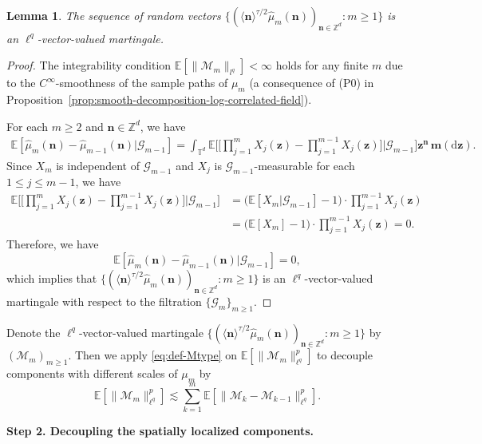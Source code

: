 \documentclass[12pt]{amsart}
\newtheorem{lemma}[theorem]{Lemma}
\theoremstyle{definition}
\theoremstyle{remark}
\newcommand{\bz}{\boldsymbol{z}}
\newcommand{\Z}{\mathbb{Z}}
\newcommand{\E}{\mathbb{E}}
\newcommand{\T}{\mathbb{T}}
\numberwithin{equation}{section}
\begin{document}
\begin{lemma}
The sequence of random vectors $\{(\langle \boldsymbol{n}\rangle^{\tau/2}\widehat{\mu}_m(\boldsymbol{n}))_{\boldsymbol{n}\in \Z^d}:m\ge 1\}$ is an $\ell^q$-vector-valued martingale.
\end{lemma}
\begin{proof}

The integrability condition $\E[\|\mathcal{M}_m\|_{l^q}] < \infty$ holds for any finite $m$ due to the $C^\infty$-smoothness of the sample paths of $\mu_m$ (a consequence of (P0) in Proposition~\ref{prop:smooth-decomposition-log-correlated-field}).

For each $m\ge 2$ and $\boldsymbol{n}\in \Z^d$, we have
\begin{align*}
\E[\widehat{\mu}_m(\boldsymbol{n})-\widehat{\mu}_{m-1}(\boldsymbol{n})|\mathscr{G}_{m-1}]=\int_{\T^d}\E\Big[\big[\prod_{j=1}^m X_j(\bz)-\prod_{j=1}^{m-1}X_j(\bz)\big]\Big| \mathscr{G}_{m-1}\Big]\bz^{\boldsymbol{n}}\,\boldsymbol{m}(\mathrm{d}\bz).
\end{align*}
Since $X_m$ is independent of $\mathscr{G}_{m-1}$ and $X_j$ is $\mathscr{G}_{m-1}$-measurable for each $1\le j\le m-1$, we have
\begin{align*}
\E\Big[\big[\prod_{j=1}^m X_j(\bz)-\prod_{j=1}^{m-1}X_j(\bz)\big]\Big| \mathscr{G}_{m-1}\Big]&=\big(\E[X_m|\mathscr{G}_{m-1}]-1\big)\cdot \prod_{j=1}^{m-1}X_j(\bz)\\
&=\big(\E[X_m]-1\big)\cdot \prod_{j=1}^{m-1}X_j(\bz)=0.
\end{align*}
Therefore, we have
\[
\E[\widehat{\mu}_m(\boldsymbol{n})-\widehat{\mu}_{m-1}(\boldsymbol{n})|\mathscr{G}_{m-1}]=0,
\]
which implies that $\{(\langle \boldsymbol{n}\rangle^{\tau/2}\widehat{\mu}_m(\boldsymbol{n}))_{\boldsymbol{n}\in \Z^d}:m\ge 1\}$ is an $\ell^q$-vector-valued martingale with respect to the filtration $\{\mathscr{G}_m\}_{m\ge 1}$.
\end{proof}
Denote the $\ell^q$-vector-valued martingale $\{(\langle \boldsymbol{n}\rangle^{\tau/2}\widehat{\mu}_m(\boldsymbol{n}))_{\boldsymbol{n}\in \Z^d}:m\ge 1\}$ by $(\mathcal{M}_m)_{m\ge 1}$. Then we apply \eqref{eq:def-Mtype} on $\E[\|\mathcal{M}_m\|_{\ell^q}^p]$ to decouple components with different scales of $\mu_m$ by
\begin{equation}\label{eq:decoupling-martingale}
\E[\|\mathcal{M}_m\|_{\ell^q}^p]\lesssim \sum_{k=1}^m \E[\|\mathcal{M}_{k}-\mathcal{M}_{k-1}\|_{\ell^q}^p].
\end{equation}

\medskip
{\flushleft \bf Step 2. Decoupling the spatially localized components.}
\medskip
\end{document}

